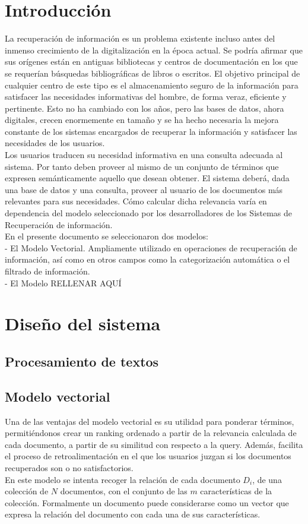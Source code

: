 \documentclass[runningheads,a4paper]{llncs}
\begin{document}
\section{Introducción}
La recuperación de información es un problema existente incluso antes del inmenso crecimiento de la digitalización en la época actual. Se podría afirmar que sus orígenes están en antiguas bibliotecas y centros de documentación en los que se requerían búsquedas bibliográficas de libros o escritos. El objetivo principal de cualquier centro de este tipo es el almacenamiento seguro de la información para satisfacer las necesidades informativas del hombre, de forma veraz, eficiente y pertinente. Esto no ha cambiado con los años, pero las bases de datos, ahora digitales, crecen enormemente en tamaño y se ha hecho necesaria la mejora constante de los sistemas encargados de recuperar la información y satisfacer las necesidades de los usuarios. \\
Los usuarios traducen su necesidad informativa en una consulta adecuada al sistema. Por tanto deben proveer al mismo de un conjunto de términos que expresen semánticamente aquello que desean obtener. El sistema deberá, dada una base de datos y una consulta, proveer al usuario de los documentos más relevantes para sus necesidades. Cómo calcular dicha relevancia varía en dependencia del modelo seleccionado por los desarrolladores de los Sistemas de Recuperación de información.\\
En el presente documento se seleccionaron dos modelos:\\
- El Modelo Vectorial. Ampliamente utilizado en operaciones de recuperación de información, así como en otros campos como la categorización automática o el filtrado de información.\\
- El Modelo RELLENAR AQUÍ


\section{Diseño del sistema}

\subsection*{Procesamiento de textos}



\subsection*{Modelo vectorial}
Una de las ventajas del modelo vectorial es su utilidad para ponderar términos, permitiéndonos crear un ranking ordenado a partir de la relevancia calculada de cada documento, a partir de su similitud con respecto a la query. Además, facilita el proceso de retroalimentación en el que los usuarios juzgan si los documentos recuperados son o no satisfactorios.\\
En este modelo se intenta recoger la relación de cada documento $D_i$, de una colección de $N$ documentos, con el conjunto de las $m$ características de la colección. Formalmente un documento puede considerarse como un vector que expresa la relación del documento con cada una de sus características.
\end{document}
